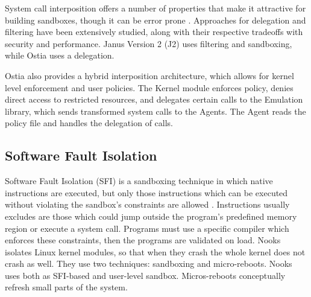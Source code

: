 \par
System call interposition offers a number of properties that make it attractive for building sandboxes, though it can be error prone \cite{SCI:04}. Approaches for delegation and filtering have been extensively studied, along with their respective tradeoffs with security and performance. Janus Version 2 (J2) \cite{Janus0:96, Janus:99} uses filtering and sandboxing, while Ostia \cite{SCI:04} uses a delegation.

\par
Ostia also provides a hybrid interposition architecture, which allows for kernel level enforcement and user policies. The Kernel module enforces policy, denies direct access to restricted resources, and delegates certain calls to the Emulation library, which sends transformed system calls to the Agents. The Agent reads the policy file and handles the delegation of calls.


\subsection{Software Fault Isolation}

\par
Software Fault Isolation (SFI) is a sandboxing technique in which native instructions are executed, but only those instructions which can be executed without violating the sandbox's constraints are allowed \cite{SFI:93}. Instructions usually excludes are those which could jump outside the program's predefined memory region or execute a system call. Programs must use a specific compiler which enforces these constraints, then the programs are validated on load. Nooks \cite{Nooks:03} isolates Linux kernel modules, so that when they crash the whole kernel does not crash as well. They use two techniques: sandboxing and micro-reboots. Nooks uses both as SFI-based and user-level sandbox. Micros-reboots conceptually refresh small parts of the system.